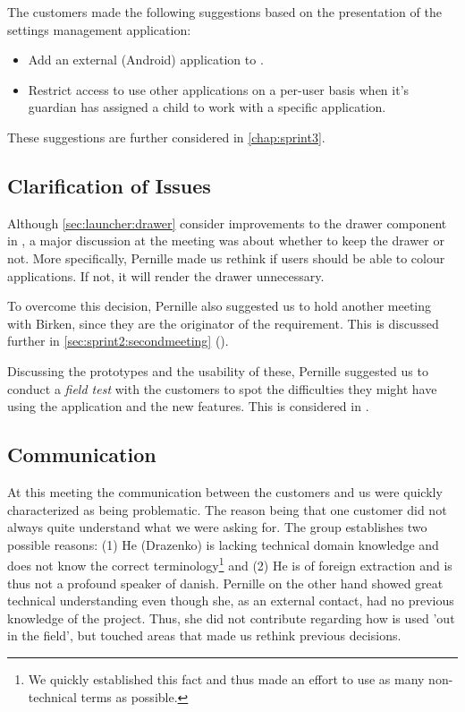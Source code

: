 The customers made the following suggestions based on the presentation of the settings management application:

\begin{itemize}
\item Add an external (Android) application to \launcher.
\item Restrict access to use other applications on a per-user basis when it's guardian has assigned a child to work with a specific application.
\end{itemize}

These suggestions are further considered in \cref{chap:sprint3}.


\subsection{Clarification of Issues}
Although \cref{sec:launcher:drawer} consider improvements to the drawer component in \giraf, a major discussion at the meeting was about whether to keep the drawer or not.
More specifically, Pernille made us rethink if users should be able to colour applications.
If not, it will render the drawer unnecessary.

To overcome this decision, Pernille also suggested us to hold another meeting with Birken, since they are the originator of the requirement.
This is discussed further in \cref{sec:sprint2:secondmeeting} ().

Discussing the prototypes and the usability of these, Pernille suggested us to conduct a \textit{field test} with the customers to spot the difficulties they might have using the application and the new features.
This is considered in .

\subsection{Communication}
At this meeting the communication between the customers and us were quickly characterized as being problematic.
The reason being that one customer did not always quite understand what we were asking for.
The group establishes two possible reasons:
(1) He (Drazenko) is lacking technical domain knowledge and does not know the correct terminology\footnote{We quickly established this fact and thus made an effort to use as many non-technical terms as possible.} and (2) He is of foreign extraction and is thus not a profound speaker of danish.
Pernille on the other hand showed great technical understanding even though she, as an external contact, had no previous knowledge of the \giraf project.
Thus, she did not contribute regarding how \giraf is used 'out in the field', but touched areas that made us rethink previous decisions.


